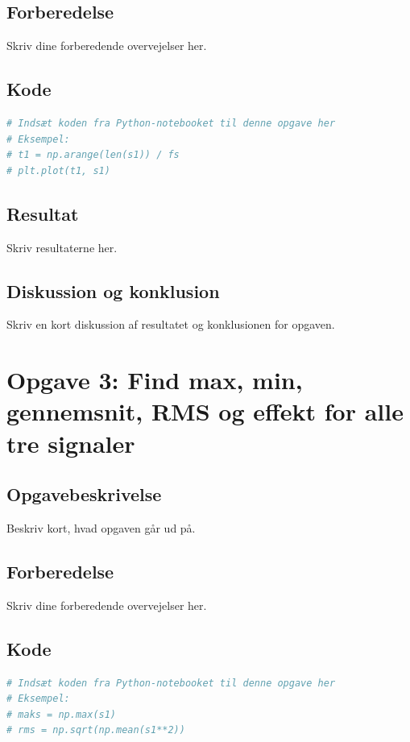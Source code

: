 ﻿\documentclass[11pt,a4paper]{report}
\begin{document}
\subsection{Forberedelse}
Skriv dine forberedende overvejelser her.

\subsection{Kode}
\begin{lstlisting}[language=Python]
# Indsæt koden fra Python-notebooket til denne opgave her
# Eksempel:
# t1 = np.arange(len(s1)) / fs
# plt.plot(t1, s1)
\end{lstlisting}

\subsection{Resultat}
Skriv resultaterne her.

\subsection{Diskussion og konklusion}
Skriv en kort diskussion af resultatet og konklusionen for opgaven.

\newpage

\section{Opgave 3: Find max, min, gennemsnit, RMS og effekt for alle tre signaler}
\subsection{Opgavebeskrivelse}
Beskriv kort, hvad opgaven går ud på.

\subsection{Forberedelse}
Skriv dine forberedende overvejelser her.

\subsection{Kode}
\begin{lstlisting}[language=Python]
# Indsæt koden fra Python-notebooket til denne opgave her
# Eksempel:
# maks = np.max(s1)
# rms = np.sqrt(np.mean(s1**2))
\end{lstlisting}
\end{document}

